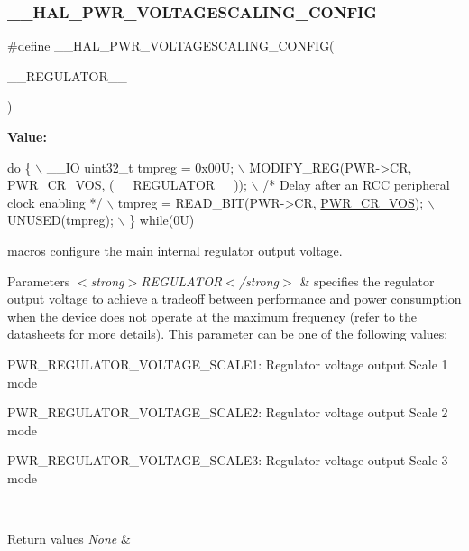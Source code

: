 \subsubsection{\texorpdfstring{\+\_\+\+\_\+\+H\+A\+L\+\_\+\+P\+W\+R\+\_\+\+V\+O\+L\+T\+A\+G\+E\+S\+C\+A\+L\+I\+N\+G\+\_\+\+C\+O\+N\+F\+IG}{\_\_HAL\_PWR\_VOLTAGESCALING\_CONFIG}}
{\footnotesize\ttfamily \#define \+\_\+\+\_\+\+H\+A\+L\+\_\+\+P\+W\+R\+\_\+\+V\+O\+L\+T\+A\+G\+E\+S\+C\+A\+L\+I\+N\+G\+\_\+\+C\+O\+N\+F\+IG(\begin{DoxyParamCaption}\item[{}]{\+\_\+\+\_\+\+R\+E\+G\+U\+L\+A\+T\+O\+R\+\_\+\+\_\+ }\end{DoxyParamCaption})}

{\bfseries Value\+:}
\begin{DoxyCode}
\textcolor{keywordflow}{do} \{                                                     \(\backslash\)
                                                            \_\_IO uint32\_t tmpreg = 0x00U;                  
            \(\backslash\)
                                                            MODIFY\_REG(PWR->CR, 
      \hyperlink{group___peripheral___registers___bits___definition_gaccc33f1ba4e374e116ffa50f3a503030}{PWR\_CR\_VOS}, (\_\_REGULATOR\_\_));   \(\backslash\)
                                                            \textcolor{comment}{/* Delay after an RCC peripheral clock enabling
       */}  \(\backslash\)
                                                            tmpreg = READ\_BIT(PWR->CR, 
      \hyperlink{group___peripheral___registers___bits___definition_gaccc33f1ba4e374e116ffa50f3a503030}{PWR\_CR\_VOS});             \(\backslash\)
                                                            UNUSED(tmpreg);                                
           \(\backslash\)
                                                          \} \textcolor{keywordflow}{while}(0U)
\end{DoxyCode}


macros configure the main internal regulator output voltage. 


\begin{DoxyParams}{Parameters}
{\em $<$strong$>$\+R\+E\+G\+U\+L\+A\+T\+O\+R$<$/strong$>$} & specifies the regulator output voltage to achieve a tradeoff between performance and power consumption when the device does not operate at the maximum frequency (refer to the datasheets for more details). This parameter can be one of the following values\+: \begin{DoxyItemize}
\item P\+W\+R\+\_\+\+R\+E\+G\+U\+L\+A\+T\+O\+R\+\_\+\+V\+O\+L\+T\+A\+G\+E\+\_\+\+S\+C\+A\+L\+E1\+: Regulator voltage output Scale 1 mode \item P\+W\+R\+\_\+\+R\+E\+G\+U\+L\+A\+T\+O\+R\+\_\+\+V\+O\+L\+T\+A\+G\+E\+\_\+\+S\+C\+A\+L\+E2\+: Regulator voltage output Scale 2 mode \item P\+W\+R\+\_\+\+R\+E\+G\+U\+L\+A\+T\+O\+R\+\_\+\+V\+O\+L\+T\+A\+G\+E\+\_\+\+S\+C\+A\+L\+E3\+: Regulator voltage output Scale 3 mode \end{DoxyItemize}
\\
\hline
\end{DoxyParams}

\begin{DoxyRetVals}{Return values}
{\em None} & \\
\hline
\end{DoxyRetVals}
